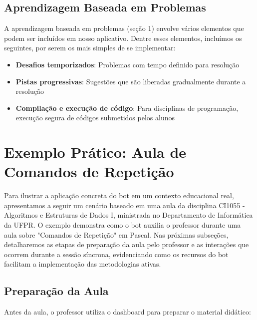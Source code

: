 
\subsection{Aprendizagem Baseada em Problemas}
\label{subsec:pbl}

A aprendizagem baseada em problemas (seção 1) envolve vários elementos que podem ser incluídos em nosso aplicativo. Dentre esses elementos, incluímos os seguintes, por serem os mais simples de se implementar:

\begin{itemize}
\item \textbf{Desafios temporizados}: Problemas com tempo definido para resolução
\item \textbf{Pistas progressivas}: Sugestões que são liberadas gradualmente durante a resolução
\item \textbf{Compilação e execução de código}: Para disciplinas de programação, execução segura de códigos submetidos pelos alunos
\end{itemize}


\section{Exemplo Prático: Aula de Comandos de Repetição}
\label{sec:exemplo}

Para ilustrar a aplicação concreta do bot em um contexto educacional real, apresentamos a seguir um cenário baseado em uma aula da disciplina CI1055 - Algoritmos e Estruturas de Dados I, ministrada no Departamento de Informática da UFPR. O exemplo demonstra como o bot auxilia o professor durante uma aula sobre "Comandos de Repetição" em Pascal. Nas próximas subseções, detalharemos as etapas de preparação da aula pelo professor e as interações que ocorrem durante a sessão síncrona, evidenciando como os recursos do bot facilitam a implementação das metodologias ativas.


\subsection{Preparação da Aula}
\label{subsec:preparacao}

Antes da aula, o professor utiliza o dashboard para preparar o material didático:

